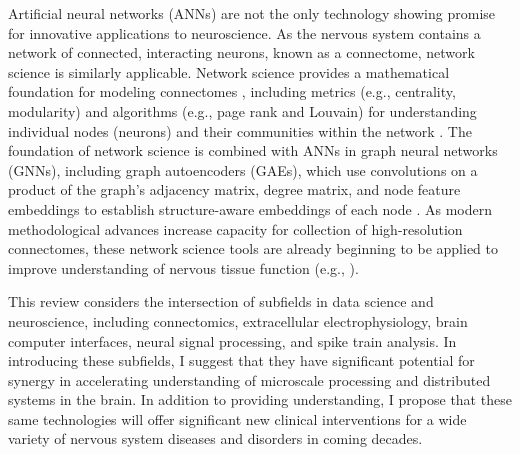 \documentclass[11pt]{article}
\begin{document}
Artificial neural networks (ANNs) are not the only technology showing promise for innovative applications to neuroscience. As the nervous system contains a network of connected, interacting neurons, known as a connectome, network science is similarly applicable. Network science provides a mathematical foundation for modeling connectomes \cite{emmons2015connectomics, easley2010networks, newman2010networks}, including metrics (e.g., centrality, modularity) and algorithms (e.g., page rank and Louvain) for understanding individual nodes (neurons) and their communities within the network \cite{easley2010networks, newman2010networks}. The foundation of network science is combined with ANNs in graph neural networks (GNNs), including graph autoencoders (GAEs), which use convolutions on a product of the graph's adjacency matrix, degree matrix, and node feature embeddings to establish structure-aware embeddings of each node \cite{velickovic2018graphattentionnetworks, kipf2016gae}. As modern methodological advances increase capacity for collection of high-resolution connectomes, these network science tools are already beginning to be applied to improve understanding of nervous tissue function (e.g., \cite{srinivasan2025gnnconnectome, neudorf2022gnnconnectome}).

This review considers the intersection of subfields in data science and neuroscience, including connectomics, extracellular electrophysiology, brain computer interfaces, neural signal processing, and spike train analysis. In introducing these subfields, I suggest that they have significant potential for synergy in accelerating understanding of microscale processing and distributed systems in the brain. In addition to providing understanding, I propose that these same technologies will offer significant new clinical interventions for a wide variety of nervous system diseases and disorders in coming decades.
\end{document}
